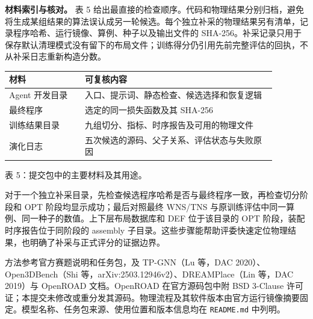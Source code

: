 \documentclass[UTF8,a4paper,11pt]{ctexart}
\begin{document}
\textbf{材料索引与核对。} 表 5 给出最直接的检查顺序。代码和物理结果分别归档，避免将生成某组结果的算法误认成另一轮候选。每个独立补采的物理结果另有清单，记录程序哈希、运行镜像、算例、种子以及输出文件的 SHA-256。补采记录只用于保存默认清理模式没有留下的布局文件；训练得分仍引用先前完整评估的回执，不从补采日志重新构造分数。
\begin{center}\small
\begin{tabular}{p{0.25\linewidth}p{0.63\linewidth}}
\toprule
材料 & 可复核内容\\
\midrule
Agent 开发目录 & 入口、提示词、静态检查、候选选择和恢复逻辑\\
最终程序 & 选定的同一损失函数及其 SHA-256\\
训练结果目录 & 九组切分、指标、时序报告及可用的物理文件\\
演化日志 & 五次候选的源码、父子关系、评估状态与失败原因\\
\bottomrule
\end{tabular}\par
\smallskip 表 5：提交包中的主要材料及其用途。
\end{center}

对于一个独立补采目录，先检查候选程序哈希是否与最终程序一致，再检查切分阶段和 OPT 阶段均显示成功；最后对照最终 WNS/TNS 与原训练评估中同一算例、同一种子的数值。上下层布局数据库和 DEF 位于该目录的 OPT 阶段，装配时序报告位于同阶段的 assembly 子目录。这些步骤能帮助评委快速定位物理结果，也明确了补采与正式评分的证据边界。

方法参考官方赛题说明和任务包，及 TP-GNN（Lu 等，DAC 2020）、Open3DBench（Shi 等，arXiv:2503.12946v2）、DREAMPlace（Lin 等，DAC 2019）与 OpenROAD 文档。OpenROAD 在官方源码包中附 BSD 3-Clause 许可证；本提交未修改或重分发其源码。物理流程及其软件版本由官方运行镜像摘要固定。模型名称、任务包来源、使用位置和版本信息均在 \texttt{README.md} 中列明。
\end{document}
